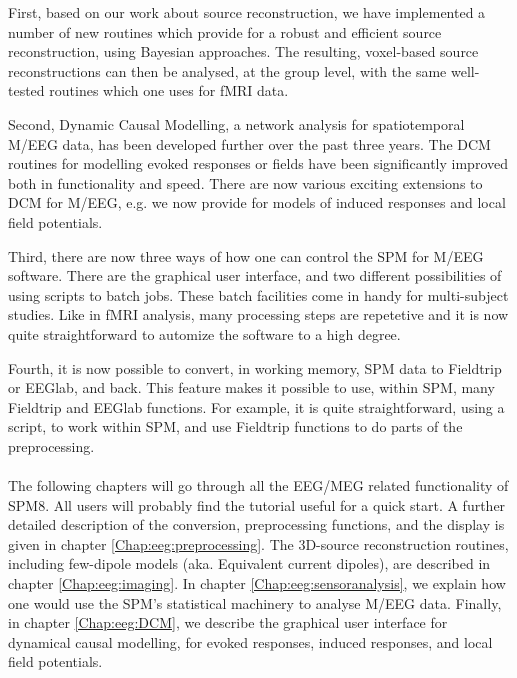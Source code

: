 First, based on our work about source reconstruction, we have
implemented a number of new routines which provide for a robust and
efficient source reconstruction, using Bayesian approaches. The
resulting, voxel-based source reconstructions can then be analysed, at
the group level, with the same well-tested routines which one uses for
fMRI data.

Second, Dynamic Causal Modelling, a network analysis for spatiotemporal
M/EEG data, has been developed further over the past three years. The
DCM routines for modelling evoked responses or 
fields have been significantly improved both in functionality and
speed. There are now various exciting extensions to DCM for M/EEG,
e.g. we now provide for models of induced responses and local field
potentials. 

Third, there are now three ways of how one can control the
SPM for M/EEG software. There are the graphical user interface, and two
different possibilities of using scripts to batch jobs. These batch
facilities come in handy for multi-subject studies. Like in fMRI
analysis, many processing steps are repetetive and it is now quite
straightforward to automize the software to a high degree.

Fourth, it is now possible to convert, in working memory, SPM
data to Fieldtrip or EEGlab, and back. This feature makes it possible to 
use, within SPM, many Fieldtrip and EEGlab functions. For example, it
is quite straightforward, using a script, to work within SPM, and use
Fieldtrip functions to do parts of the preprocessing. 
\\
\\
The following chapters will go through all the EEG/MEG related
functionality of SPM8. All users will probably find the tutorial
useful for a quick start. A further detailed description of the
conversion, preprocessing functions, and the display is given in chapter
\ref{Chap:eeg:preprocessing}. The 3D-source reconstruction routines,
including few-dipole models (aka. Equivalent current dipoles), are described in chapter
\ref{Chap:eeg:imaging}. In chapter \ref{Chap:eeg:sensoranalysis}, we
explain how one would use the SPM's statistical machinery to analyse
M/EEG data. Finally, in chapter \ref{Chap:eeg:DCM}, we describe the
graphical user interface for dynamical causal modelling, for evoked  
responses, induced responses, and local field potentials.

